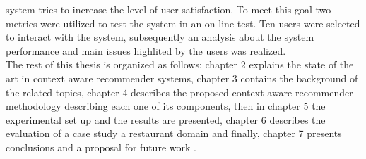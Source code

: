 system tries to increase the level of user satisfaction. To meet this
goal two metrics were utilized to test the system in an on-line test.
Ten users were selected to interact with the system, subsequently an
analysis about the system performance and main issues highlited by the
users was realized. \\
The rest of this thesis is organized as follows: chapter 2 explains
the state of the art in context aware recommender systems,  
chapter 3 contains the background of the related topics, 
chapter 4  describes the proposed context-aware recommender methodology
describing each one of its components, then in chapter 5 the experimental set up
and the results are presented, chapter 6 describes
the evaluation of a case study a restaurant domain and finally, chapter 7
presents conclusions and a proposal for future work .




